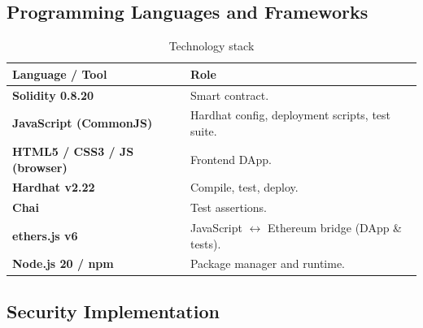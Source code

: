 \documentclass[12pt,a4paper]{article}
\begin{document}
\subsection{Programming Languages and Frameworks}

\begin{table}[h]
  \centering
  \begin{tabularx}{\linewidth}{>{\bfseries}lX}
    \toprule
    Language / Tool & Role \\
    \midrule
    Solidity 0.8.20 & Smart contract. \\
    JavaScript (CommonJS) & Hardhat config, deployment scripts, test suite. \\
    HTML5 / CSS3 / JS (browser) & Frontend DApp. \\
    Hardhat v2.22 & Compile, test, deploy. \\
    Chai & Test assertions. \\
    ethers.js v6 & JavaScript $\leftrightarrow$ Ethereum bridge (DApp \& tests). \\
    Node.js 20 / npm & Package manager and runtime. \\
    \bottomrule
  \end{tabularx}
  \caption{Technology stack}
\end{table}

\subsection{Security Implementation}
\end{document}
